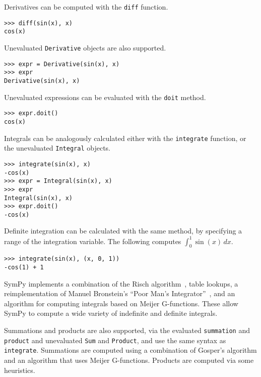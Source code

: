 

Derivatives can be computed with the \verb|diff| function.

\begin{verbatim}
>>> diff(sin(x), x)
cos(x)
\end{verbatim}

Unevaluated \verb|Derivative| objects are also supported.

\begin{verbatim}
>>> expr = Derivative(sin(x), x)
>>> expr
Derivative(sin(x), x)
\end{verbatim}

Unevaluated expressions can be evaluated with the \verb|doit| method.

\begin{verbatim}
>>> expr.doit()
cos(x)
\end{verbatim}

Integrals can be analogously calculated either with the \verb|integrate|
function, or the unevaluated \verb|Integral| objects.
\begin{verbatim}
>>> integrate(sin(x), x)
-cos(x)
>>> expr = Integral(sin(x), x)
>>> expr
Integral(sin(x), x)
>>> expr.doit()
-cos(x)
\end{verbatim}
Definite integration can be calculated with the same method, by specifying a
range of the integration variable. The following computes $\int_0^1\sin(x)\,dx$.
\begin{verbatim}
>>> integrate(sin(x), (x, 0, 1))
-cos(1) + 1
\end{verbatim}

SymPy implements a combination of the Risch
algorithm~\cite{bronstein2005integration}, table lookups, a reimplementation
of Manuel Bronstein's ``Poor Man's Integrator''~\cite{Bronstein2005pmint}, and
an algorithm for computing integrals based on Meijer G-functions. These allow
SymPy to compute a wide variety of indefinite and definite integrals.

Summations and products are also supported, via the evaluated \verb|summation|
and \verb|product| and unevaluated \verb|Sum| and \verb|Product|, and use the
same syntax as \verb|integrate|. Summations are computed using a combination
of Gosper's algorithm and an algorithm that uses Meijer G-functions. Products
are computed via some heuristics.


